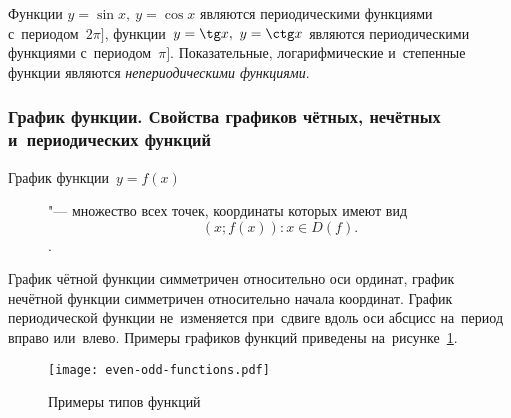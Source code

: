 \documentclass[]{scrartcl}
\begin{document}
Функции ${\textstyle y=\sin x,\ y=\cos x}$ являются периодическими функциями с~периодом~${\textstyle 2\pi]}$, функции~${\textstyle y=\tg x,\ y=\ctg x}$   являются периодическими функциями с~периодом~${\textstyle \pi]}$. Показательные, логарифмические и~степенные функции являются \emph{непериодическими функциями}.

\subsubsection{График функции. Свойства графиков чётных, нечётных и~периодических функций}
\begin{description}
	\item[График функции~${\textstyle y=f(x)}$] "--- множество всех точек, координаты которых имеют вид
	\begin{equation}\label{eq:func-graph-coord}
	(x;f(x)):x\in D(f).
	\end{equation}.
\end{description}
График чётной функции симметричен относительно оси ординат, график нечётной функции симметричен относительно начала координат. График периодической функции не~изменяется при~сдвиге вдоль оси абсцисс на~период вправо или~влево. Примеры графиков функций приведены на~рисунке~\ref{fig:even-odd-functions}.

\begin{figure}[ht]
	\centering %
	\texttt{[image: even-odd-functions.pdf]}
	\caption{Примеры типов функций}\label{fig:even-odd-functions}
\end{figure}
\end{document}
